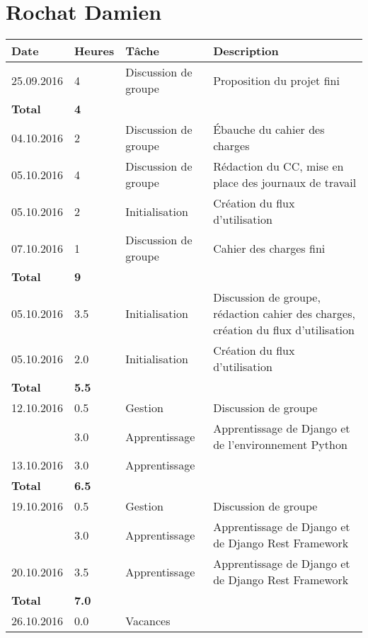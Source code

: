 \documentclass[french]{article}
\begin{document}
	\section*{Rochat Damien}
	\begin{longtable}{p{}|p{}|p{}|p{}}
		Date & Heures & Tâche & Description \\
		\hline
		
		\hline
		25.09.2016 & 4 & Discussion de groupe & Proposition du projet fini\\
		\textbf{Total} & \textbf{4} &&\\
		\hline
		04.10.2016 & 2 & Discussion de groupe & Ébauche du cahier des charges\\
		05.10.2016 & 4 & Discussion de groupe & Rédaction du CC, mise en place des journaux de travail\\
		05.10.2016 & 2 & Initialisation & Création du flux d'utilisation \\
		07.10.2016 & 1 & Discussion de groupe & Cahier des charges fini\\
		\textbf{Total} & \textbf{9} &&\\
		\hline
		
		\hline
		05.10.2016 & 3.5 & Initialisation & Discussion de groupe, rédaction cahier des charges, création du flux d'utilisation \\
		05.10.2016 & 2.0 & Initialisation & Création du flux d'utilisation \\
		\textbf{Total} & \textbf{5.5} && \\
		
		\hline
		12.10.2016 & 0.5 & Gestion & Discussion de groupe \\
			       & 3.0 & Apprentissage & Apprentissage de Django et de l'environnement Python \\
		13.10.2016 & 3.0 & \multicolumn{2}{l}{Apprentissage} \\
		\textbf{Total} & \textbf{6.5} && \\
		
		\hline
		19.10.2016 & 0.5 & Gestion & Discussion de groupe \\
				   & 3.0 & Apprentissage & Apprentissage de Django et de Django Rest Framework \\
	    20.10.2016 & 3.5 & Apprentissage & Apprentissage de Django et de Django Rest Framework \\
		\textbf{Total} & \textbf{7.0} && \\
		
		\hline
		26.10.2016 & 0.0 & \multicolumn{2}{l}{Vacances} \\
		

\end{longtable}
\end{document}
